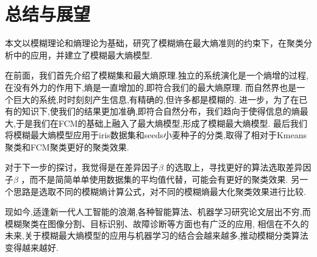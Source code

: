 \chapter{总结与展望}
\par 
本文以模糊理论和熵理论为基础，研究了模糊熵在最大熵准则的约束下，在聚类分析中的应用，并建立了模糊最大熵模型.

在前面，我们首先介绍了模糊集和最大熵原理.独立的系统演化是一个熵增的过程,在没有外力的作用下,熵是一直增加的,即符合我们的最大熵原理.
而自然界也是一个巨大的系统,时时刻刻产生信息,有精确的,但许多都是模糊的.
进一步，为了在已有的知识下,使我们的结果更加准确,即符合自然分布，我们趋向于使得信息的熵最大,于是我们在FCM的基础上融入了最大熵模型,形成了模糊最大熵模型.
最后我们将模糊最大熵模型应用于iris数据集和seeds小麦种子的分类,取得了相对于Kmeans聚类和FCM聚类更好的聚类效果.
\par
对于下一步的探讨，我觉得是在差异因子$\beta$ 的选取上，寻找更好的算法选取差异因子$\beta$ ，而不是简简单单使用数据集的平均值代替，可能会有更好的聚类效果.
另一个思路是选取不同的模糊熵计算公式，对不同的模糊熵最大化聚类效果进行比较.
\par
现如今,适逢新一代人工智能的浪潮,各种智能算法、机器学习研究论文层出不穷,而模糊聚类在图像分割、目标识别、故障诊断等方面也有广泛的应用,
相信在不久的未来,关于模糊最大熵模型的应用与机器学习的结合会越来越多,推动模糊分类算法变得越来越好.